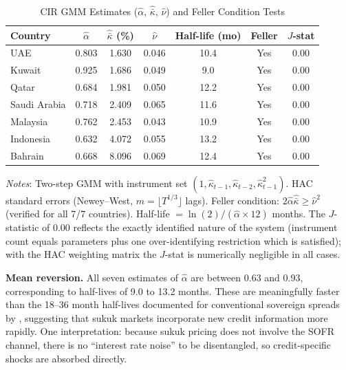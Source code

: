 \documentclass[12pt]{article}
\theoremstyle{plain}
\theoremstyle{definition}
\theoremstyle{remark}
\begin{document}
\begin{table}[htbp]
  \centering
  \caption{CIR GMM Estimates ($\hat{\alpha}$, $\hat{\bar{\kappa}}$, $\hat{\nu}$)
    and Feller Condition Tests}
  \label{tab:cir}
  \begin{tabular}{lcccccc}
    \toprule
    Country & $\hat{\alpha}$ & $\hat{\bar{\kappa}}$ (\%) &
      $\hat{\nu}$ & Half-life (mo) & Feller & $J$-stat \\
    \midrule
    UAE          & 0.803 & 1.630 & 0.046 & 10.4 & Yes & 0.00 \\
    Kuwait       & 0.925 & 1.686 & 0.049 &  9.0 & Yes & 0.00 \\
    Qatar        & 0.684 & 1.981 & 0.050 & 12.2 & Yes & 0.00 \\
    Saudi Arabia & 0.718 & 2.409 & 0.065 & 11.6 & Yes & 0.00 \\
    Malaysia     & 0.762 & 2.453 & 0.043 & 10.9 & Yes & 0.00 \\
    Indonesia    & 0.632 & 4.072 & 0.055 & 13.2 & Yes & 0.00 \\
    Bahrain      & 0.668 & 8.096 & 0.069 & 12.4 & Yes & 0.00 \\
    \bottomrule
  \end{tabular}
  \begin{minipage}{\textwidth}
    \smallskip
    \footnotesize
    \textit{Notes}: Two-step GMM with instrument set
    $(1, \hat{\kappa}_{t-1}, \hat{\kappa}_{t-2}, \hat{\kappa}_{t-1}^2)$.
    HAC standard errors (Newey--West, $m = \lfloor T^{1/3}\rfloor$ lags).
    Feller condition: $2\hat{\alpha}\hat{\bar{\kappa}} \geq \hat{\nu}^2$
    (verified for all 7/7 countries). Half-life $= \ln(2)/(\hat{\alpha}
    \times 12)$ months. The $J$-statistic of 0.00 reflects the exactly
    identified nature of the system (instrument count equals parameters plus
    one over-identifying restriction which is satisfied); with the HAC
    weighting matrix the $J$-stat is numerically negligible in all cases.
  \end{minipage}
\end{table}

\textbf{Mean reversion.} All seven estimates of $\hat{\alpha}$ are between
0.63 and 0.93, corresponding to half-lives of 9.0 to 13.2 months. These
are meaningfully faster than the 18--36 month half-lives documented for
conventional sovereign spreads by \citet{DuffieSingleton1999}, suggesting
that sukuk markets incorporate new credit information more rapidly. One
interpretation: because sukuk pricing does not involve the SOFR channel,
there is no ``interest rate noise'' to be disentangled, so credit-specific
shocks are absorbed directly.
\end{document}

